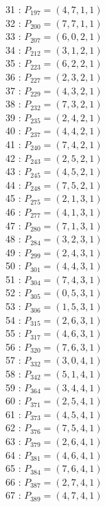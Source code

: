 \documentclass{article}
\begin{document}
{\begin{multicols}{3}
31 : $P_{197}=( 4, 7, 1, 1 )$\\
32 : $P_{200}=( 7, 7, 1, 1 )$\\
33 : $P_{207}=( 6, 0, 2, 1 )$\\
34 : $P_{212}=( 3, 1, 2, 1 )$\\
35 : $P_{223}=( 6, 2, 2, 1 )$\\
36 : $P_{227}=( 2, 3, 2, 1 )$\\
37 : $P_{229}=( 4, 3, 2, 1 )$\\
38 : $P_{232}=( 7, 3, 2, 1 )$\\
39 : $P_{235}=( 2, 4, 2, 1 )$\\
40 : $P_{237}=( 4, 4, 2, 1 )$\\
41 : $P_{240}=( 7, 4, 2, 1 )$\\
42 : $P_{243}=( 2, 5, 2, 1 )$\\
43 : $P_{245}=( 4, 5, 2, 1 )$\\
44 : $P_{248}=( 7, 5, 2, 1 )$\\
45 : $P_{275}=( 2, 1, 3, 1 )$\\
46 : $P_{277}=( 4, 1, 3, 1 )$\\
47 : $P_{280}=( 7, 1, 3, 1 )$\\
48 : $P_{284}=( 3, 2, 3, 1 )$\\
49 : $P_{299}=( 2, 4, 3, 1 )$\\
50 : $P_{301}=( 4, 4, 3, 1 )$\\
51 : $P_{304}=( 7, 4, 3, 1 )$\\
52 : $P_{305}=( 0, 5, 3, 1 )$\\
53 : $P_{306}=( 1, 5, 3, 1 )$\\
54 : $P_{315}=( 2, 6, 3, 1 )$\\
55 : $P_{317}=( 4, 6, 3, 1 )$\\
56 : $P_{320}=( 7, 6, 3, 1 )$\\
57 : $P_{332}=( 3, 0, 4, 1 )$\\
58 : $P_{342}=( 5, 1, 4, 1 )$\\
59 : $P_{364}=( 3, 4, 4, 1 )$\\
60 : $P_{371}=( 2, 5, 4, 1 )$\\
61 : $P_{373}=( 4, 5, 4, 1 )$\\
62 : $P_{376}=( 7, 5, 4, 1 )$\\
63 : $P_{379}=( 2, 6, 4, 1 )$\\
64 : $P_{381}=( 4, 6, 4, 1 )$\\
65 : $P_{384}=( 7, 6, 4, 1 )$\\
66 : $P_{387}=( 2, 7, 4, 1 )$\\
67 : $P_{389}=( 4, 7, 4, 1 )$\\

\end{multicols}}
\end{document}
